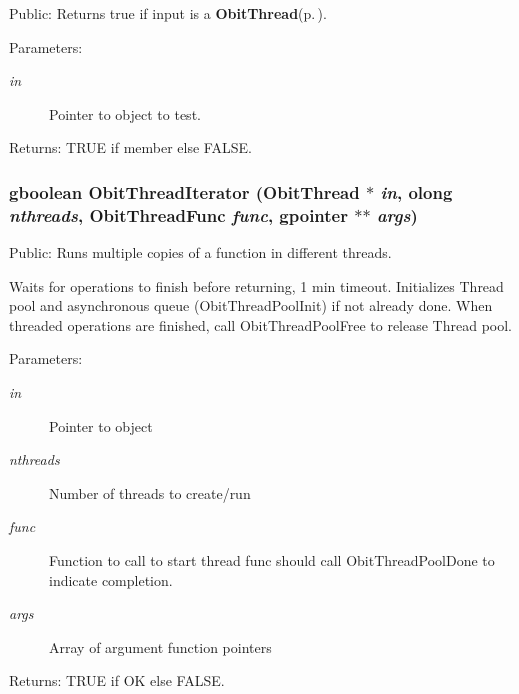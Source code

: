 Public: Returns true if input is a {\bf Obit\-Thread}{\rm (p.\,\pageref{structObitThread})}. 

\begin{Desc}
\item[Parameters:]
\begin{description}
\item[{\em in}]Pointer to object to test. \end{description}
\end{Desc}
\begin{Desc}
\item[Returns:]TRUE if member else FALSE. \end{Desc}
\subsubsection{\setlength{\rightskip}{0pt plus 5cm}gboolean Obit\-Thread\-Iterator ({\bf Obit\-Thread} $\ast$ {\em in}, {\bf olong} {\em nthreads}, {\bf Obit\-Thread\-Func} {\em func}, gpointer $\ast$$\ast$ {\em args})}\label{ObitThread_8h_a22}


Public: Runs multiple copies of a function in different threads. 

Waits for operations to finish before returning, 1 min timeout. Initializes Thread pool and asynchronous queue (Obit\-Thread\-Pool\-Init) if not already done. When threaded operations are finished, call Obit\-Thread\-Pool\-Free to release Thread pool. \begin{Desc}
\item[Parameters:]
\begin{description}
\item[{\em in}]Pointer to object \item[{\em nthreads}]Number of threads to create/run \item[{\em func}]Function to call to start thread func should call Obit\-Thread\-Pool\-Done to indicate completion. \item[{\em args}]Array of argument function pointers \end{description}
\end{Desc}
\begin{Desc}
\item[Returns:]TRUE if OK else FALSE. \end{Desc}
